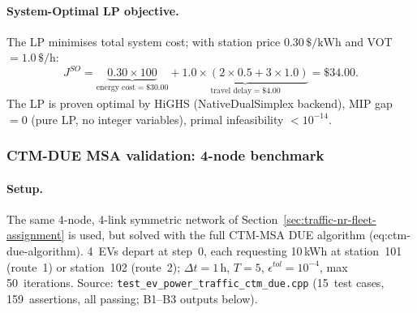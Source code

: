 \paragraph{System-Optimal LP objective.}
The LP minimises total system cost; with station price $0.30\,\$/\text{kWh}$
and VOT~$= 1.0\,\$/\text{h}$:
\begin{equation}
  J^{SO} =
    \underbrace{0.30 \times 100}_{\text{energy cost} = \$30.00}
    + \underbrace{1.0 \times (2\times 0.5 + 3\times 1.0)}_{\text{travel delay} = \$4.00}
    = \$34.00.
  \label{eq:nr-so-obj}
\end{equation}
The LP is proven optimal by HiGHS (NativeDualSimplex backend),
MIP gap $= 0$ (pure LP, no integer variables), primal infeasibility
$< 10^{-14}$.

\subsubsection{CTM-DUE MSA validation: 4-node benchmark}
\label{sec:traffic-nr-ctm-due-4node}

\paragraph{Setup.}
The same 4-node, 4-link symmetric network of
Section~\ref{sec:traffic-nr-fleet-assignment} is used, but solved with
the full CTM-MSA DUE algorithm (eq:ctm-due-algorithm).
4~EVs depart at step~0, each requesting 10\,kWh at station~101 (route~1)
or station~102 (route~2); $\Delta t = 1\,\text{h}$, $T = 5$,
$\epsilon^{tol} = 10^{-4}$, max 50~iterations.
Source: \texttt{test\_ev\_power\_traffic\_ctm\_due.cpp}
(15~test cases, 159~assertions, all passing; B1--B3 outputs below).

